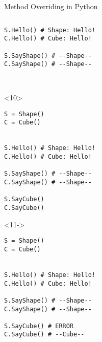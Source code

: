 \begin{frame}[fragile]{Method Overriding in Python}
\begin{columns}[onlytextwidth]
\begin{column}{0.47\textwidth}
\begin{onlyenv}
\begin{lstlisting}[style=python,basicstyle=\ttfamily\footnotesize]
S.Hello() # Shape: Hello!
C.Hello() # Cube: Hello!

S.SayShape() # --Shape--
C.SayShape() # --Shape--



 \end{lstlisting}
      \end{onlyenv}

      \begin{onlyenv}<10>
        \begin{lstlisting}[style=python,basicstyle=\ttfamily\footnotesize]
S = Shape()
C = Cube()


S.Hello() # Shape: Hello!
C.Hello() # Cube: Hello!

S.SayShape() # --Shape--
C.SayShape() # --Shape--

S.SayCube()
C.SayCube()
 \end{lstlisting}
      \end{onlyenv}

      \begin{onlyenv}<11->
        \begin{lstlisting}[style=python,basicstyle=\ttfamily\footnotesize]
S = Shape()
C = Cube()


S.Hello() # Shape: Hello!
C.Hello() # Cube: Hello!

S.SayShape() # --Shape--
C.SayShape() # --Shape--

S.SayCube() # ERROR
C.SayCube() # --Cube--
 \end{lstlisting}
      \end{onlyenv}

    \end{column}
  \end{columns}

\end{frame}


